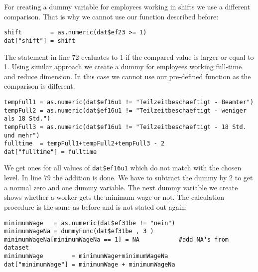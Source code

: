 For creating a dummy variable for employees working in shifts we use a different comparison. That is why we cannot use our function described before:
\lstset{firstnumber = 72}
\begin{lstlisting}
shift        = as.numeric(dat$ef23 >= 1)
dat["shift"] = shift                       
\end{lstlisting}
The statement in line 72 evaluates to 1 if the compared value is larger or equal to 1. Using similar approach we create a dummy for employees working full-time and reduce dimension. In this case we cannot use our pre-defined function as the comparison is different.
\lstset{firstnumber = 76}
\begin{lstlisting}
tempFull1 = as.numeric(dat$ef16u1 != "Teilzeitbeschaeftigt - Beamter")
tempFull2 = as.numeric(dat$ef16u1 != "Teilzeitbeschaeftigt - weniger als 18 Std.")
tempFull3 = as.numeric(dat$ef16u1 != "Teilzeitbeschaeftigt - 18 Std. und mehr")
fulltime  = tempFull1+tempFull2+tempFull3 - 2
dat["fulltime"] = fulltime         
\end{lstlisting}
We get ones for all values of \texttt{dat\$ef16u1} which do not match with the chosen level. In line 79 the addition is done. We have to subtract the dummy by 2 to get a normal zero and one dummy variable. The next dummy variable we create shows whether a worker gets the minimum wage or not. The calculation procedure is the same as before and is not stated out again:
\lstset{firstnumber = 83}
\begin{lstlisting}
minimumWage   = as.numeric(dat$ef31be != "nein")
minimumWageNa = dummyFunc(dat$ef31be , 3 )
minimumWageNa[minimumWageNa == 1] = NA           #add NA's from dataset
minimumWage        = minimumWage+minimumWageNa
dat["minimumWage"] = minimumWage + minimumWageNa 
\end{lstlisting}


